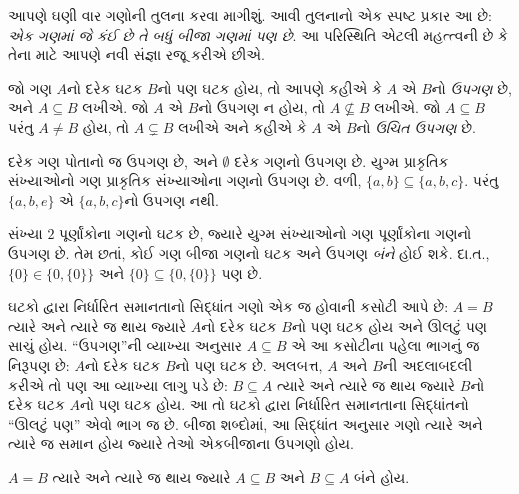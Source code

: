 \begingroup
\makeatletter{}\makeatother

\label{guunit:OLP-0006}


\begin{explain}
આપણે ઘણી વાર ગણોની તુલના કરવા માગીશું. આવી તુલનાનો એક સ્પષ્ટ પ્રકાર આ છે:
\emph{એક ગણમાં જે કંઈ છે તે બધું બીજા ગણમાં પણ છે}.
આ પરિસ્થિતિ એટલી મહત્ત્વની છે કે તેના માટે આપણે નવી સંજ્ઞા રજૂ કરીએ છીએ.
\end{explain}

\begin{defn}[ઉપગણ]
જો ગણ $A$નો દરેક ઘટક $B$નો પણ ઘટક હોય, તો આપણે કહીએ
કે $A$ એ $B$નો \emph{ઉપગણ} છે, અને $A \subseteq B$ લખીએ.
જો $A$ એ $B$નો ઉપગણ ન હોય, તો $A \not\subseteq B$ લખીએ.
જો $A \subseteq B$ પરંતુ $A \neq B$ હોય, તો $A \subsetneq B$ લખીએ
અને કહીએ કે $A$ એ $B$નો \emph{ઉચિત ઉપગણ} છે.
\end{defn}

\begin{ex}
દરેક ગણ પોતાનો જ ઉપગણ છે, અને $\emptyset$ દરેક ગણનો ઉપગણ છે.
યુગ્મ પ્રાકૃતિક સંખ્યાઓનો ગણ પ્રાકૃતિક સંખ્યાઓના ગણનો ઉપગણ છે.
વળી, $\{ a, b \} \subseteq \{ a, b, c \}$.
પરંતુ $\{ a, b, e \}$ એ $\{ a, b, c \}$નો ઉપગણ નથી.
\end{ex}

\begin{ex}
સંખ્યા $2$ પૂર્ણાંકોના ગણનો ઘટક છે, જ્યારે યુગ્મ સંખ્યાઓનો ગણ
પૂર્ણાંકોના ગણનો ઉપગણ છે. તેમ છતાં, કોઈ ગણ બીજા ગણનો ઘટક
અને ઉપગણ \emph{બંને} હોઈ શકે. દા.ત.,
$\{0\} \in \{0, \{0\}\}$ અને $\{0\} \subseteq \{0, \{0\}\}$ પણ છે.
\end{ex}

ઘટકો દ્વારા નિર્ધારિત સમાનતાનો સિદ્ધાંત ગણો એક જ હોવાની કસોટી આપે છે:
$A = B$ ત્યારે અને ત્યારે જ થાય જ્યારે $A$નો દરેક ઘટક
$B$નો પણ ઘટક હોય અને ઊલટું પણ સાચું હોય.
“ઉપગણ”ની વ્યાખ્યા અનુસાર $A \subseteq B$ એ આ કસોટીના પહેલા ભાગનું જ
નિરૂપણ છે: $A$નો દરેક ઘટક $B$નો પણ ઘટક છે.
અલબત્ત, $A$ અને $B$ની અદલાબદલી કરીએ તો પણ આ વ્યાખ્યા લાગુ પડે છે:
$B \subseteq A$ ત્યારે અને ત્યારે જ થાય જ્યારે $B$નો દરેક ઘટક
$A$નો પણ ઘટક હોય. આ તો ઘટકો દ્વારા નિર્ધારિત સમાનતાના
સિદ્ધાંતનો “ઊલટું પણ” એવો ભાગ જ છે.
બીજા શબ્દોમાં, આ સિદ્ધાંત અનુસાર ગણો ત્યારે અને ત્યારે જ સમાન હોય
જ્યારે તેઓ એકબીજાના ઉપગણો હોય.

\begin{prop}
$A = B$ ત્યારે અને ત્યારે જ થાય જ્યારે $A \subseteq B$ અને $B \subseteq A$ બંને હોય.
\end{prop}

